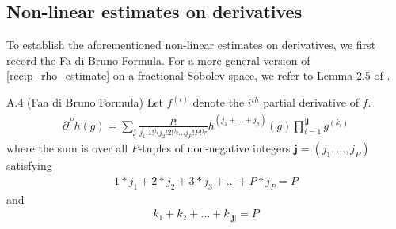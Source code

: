 \documentclass[11pt,letterpaper]{amsart}
\theoremstyle{plain}
\theoremstyle{definition}
\theoremstyle{remark}
\begin{document}
\subsection{Non-linear estimates on derivatives}
To establish the aforementioned non-linear estimates on derivatives, we first record the Fa di Bruno Formula.
For a more general version of \ref{recip_rho_estimate} on a fractional Sobolev space, we refer to Lemma 2.5 of 
\cite{lear_reynolds_shvydkoy2020local}.  



\begin{customformula}{A.4} (Faa di Bruno Formula)
    Let $f^{(i)}$ denote the $i^{th}$ partial derivative of $f$. 
    \begin{align*}
        \partial^P h(g) = \sum_{\textbf{j}} \frac{P!}{j_1!1!^{j_1} j_2!2!^{j_2} \dots j_P!P!^{j_P}} h^{(j_1 + \dots + j_p)}(g) 
                                \prod_{i=1}^{|\textbf{j}|} g^{(k_i)}
    \end{align*}
    where the sum is over all $P$-tuples of non-negative integers $\textbf{j} = (j_1, \dots, j_P)$ satisfying 
    \begin{align*}
        1*j_1 + 2*j_2 + 3*j_3 + \dots + P*j_P = P
    \end{align*}
    and 
    \begin{align*}
        k_1 + k_2 + \dots + k_{|\textbf{j}|} = P 
    \end{align*}
\end{customformula}
\end{document}
